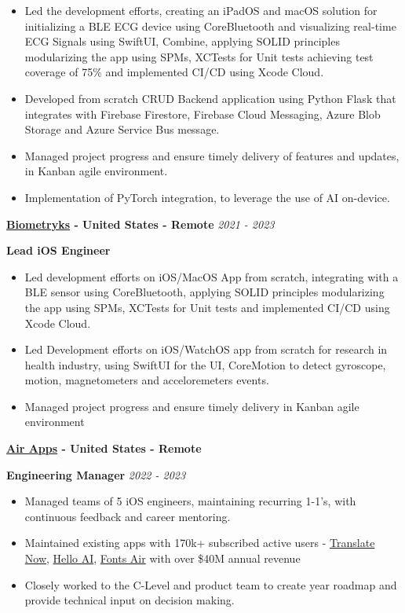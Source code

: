 \documentclass[11pt, oneside]{article}
\begin{document}
\begin{itemize}
    \item Led the development efforts, creating an iPadOS and macOS solution for initializing a BLE ECG device using CoreBluetooth and visualizing real-time ECG Signals using SwiftUI, Combine, applying SOLID principles modularizing the app using SPMs, XCTests for Unit tests achieving test coverage of 75\%  and implemented CI/CD using Xcode Cloud.
    \item Developed from scratch CRUD Backend application using Python Flask that integrates with Firebase Firestore, Firebase Cloud Messaging, Azure Blob Storage and Azure Service Bus message.
    \item Managed project progress and ensure timely delivery of features and updates, in Kanban agile environment.
    \item Implementation of PyTorch integration, to leverage the use of AI on-device.
\end{itemize}


\textbf{\href{https://www.biometryks.com}{Biometryks} - United States - Remote}
\hfill
\textit{2021 - 2023}

\textbf{Lead iOS Engineer}

\begin{itemize}
    \item Led development efforts on iOS/MacOS App from scratch, integrating with a BLE sensor using CoreBluetooth, applying SOLID principles modularizing the app using SPMs, XCTests for Unit tests and implemented CI/CD using Xcode Cloud.
    \item Led Development efforts on iOS/WatchOS app from scratch for research in health industry, using SwiftUI for the UI, CoreMotion to detect gyroscope, motion, magnetometers and acceloremeters events.
    \item Managed project progress and ensure timely delivery in Kanban agile environment
\end{itemize}

\textbf{\href{https://airapps.co}{Air Apps} - United States - Remote}

\textbf{Engineering Manager}
\hfill
\textit{2022 - 2023}

\begin{itemize}
    \item Managed teams of 5 iOS engineers, maintaining recurring 1-1’s, with continuous feedback and career mentoring. 
    \item Maintained existing apps with 170k+ subscribed active users - {\href{https://apps.apple.com/br/app/translate-now-ai-translator/id1348028646?l=en-GB}{Translate Now}}, {\href{https://apps.apple.com/br/app/hello-ai-chatbot-assistant/id1157181090?l=en-GB}{Hello AI}}, {\href{https://apps.apple.com/br/app/fonts-air-font-keyboard/id1493429933?l=en-GB}{Fonts Air}} with over \$40M annual revenue
    \item Closely worked to the C-Level and product team to create year roadmap and provide technical input on decision making.
\end{itemize}
\end{document}
